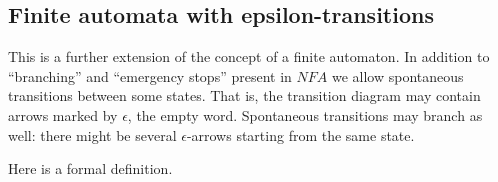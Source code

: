 \subsection{Finite automata with epsilon-transitions}
This is a further extension of the concept of a finite automaton.
In addition to ``branching'' and ``emergency stops'' present in $NFA$
we allow spontaneous transitions between some states.
That is, the transition diagram may contain arrows marked by $\epsilon$, the empty word.
Spontaneous transitions may branch as well: there might be several $\epsilon$-arrows starting from the same state.

Here is a formal definition.